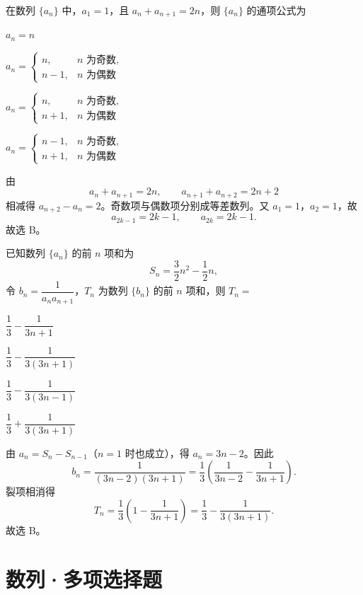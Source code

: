 \documentclass[zihao=-4]{exam-zh}
\begin{document}
\begin{question}[points=5]
在数列 $\{a_n\}$ 中，$a_1=1$，且 $a_n+a_{n+1}=2n$，则 $\{a_n\}$ 的通项公式为 \paren[B]
\begin{choices}
  \item $a_n=n$
  \item $a_n=\begin{cases}n,&n\text{ 为奇数},\\n-1,&n\text{ 为偶数}
  \end{cases}$
  \item $a_n=\begin{cases}n,&n\text{ 为奇数},\\n+1,&n\text{ 为偶数}
  \end{cases}$
  \item $a_n=\begin{cases}n-1,&n\text{ 为奇数},\\n+1,&n\text{ 为偶数}
  \end{cases}$
\end{choices}
\begin{solution}
由
\[
 a_n+a_{n+1}=2n,\qquad a_{n+1}+a_{n+2}=2n+2
\]
相减得 $a_{n+2}-a_n=2$。奇数项与偶数项分别成等差数列。又 $a_1=1$，$a_2=1$，故
\[
 a_{2k-1}=2k-1,\qquad a_{2k}=2k-1.
\]
故选 B。
\end{solution}
\end{question}

\begin{question}[points=5]
已知数列 $\{a_n\}$ 的前 $n$ 项和为
\[
 S_n=\frac32n^2-\frac12n,
\]
令 $b_n=\dfrac1{a_na_{n+1}}$，$T_n$ 为数列 $\{b_n\}$ 的前 $n$ 项和，则 $T_n=$ \paren[B]
\begin{choices}
  \item $\dfrac13-\dfrac1{3n+1}$
  \item $\dfrac13-\dfrac1{3(3n+1)}$
  \item $\dfrac13-\dfrac1{3(3n-1)}$
  \item $\dfrac13+\dfrac1{3(3n+1)}$
\end{choices}
\begin{solution}
由 $a_n=S_n-S_{n-1}$（$n=1$ 时也成立），得 $a_n=3n-2$。因此
\[
 b_n=\frac1{(3n-2)(3n+1)}
 =\frac13\left(\frac1{3n-2}-\frac1{3n+1}\right).
\]
裂项相消得
\[
 T_n=\frac13\left(1-\frac1{3n+1}\right)
 =\frac13-\frac1{3(3n+1)}.
\]
故选 B。
\end{solution}
\end{question}

\section{数列·多项选择题}
\end{document}
